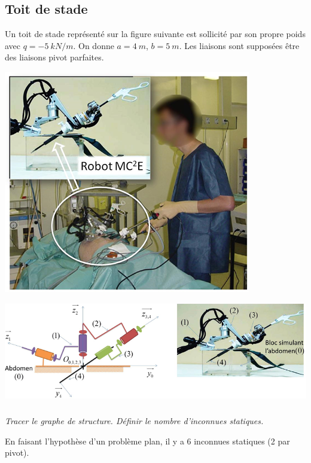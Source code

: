 \documentclass[10pt,fleqn]{article} %
\begin{document}

\vspace{4cm}
\pagestyle{fancy}
\thispagestyle{plain}


\def\columnseprulecolor{\color{ocre}}
\setlength{\columnseprule}{0.4pt} 

\ifprof
\else
\begin{multicols}{2}
\fi
\section*{Toit de stade}
Un toit de stade représenté sur la figure suivante est sollicité par son propre poids  avec $q=\SI{-5}{kN/m}$.  On donne $a=\SI{4}{m}$, $b=\SI{5}{m}$. Les liaisons sont supposées être des liaisons pivot parfaites.
\begin{center}
\includegraphics[width=.9\linewidth]{images/fig_01}
\end{center}

\begin{center}
\includegraphics[width=.9\linewidth]{images/fig_02}
\end{center}

\subparagraph{}\textit{Tracer le graphe de structure. Définir le nombre d'inconnues statiques.}
\ifprof
\begin{corrige}
En faisant l'hypothèse d'un problème plan, il y a 6 inconnues statiques (2 par pivot). 
\end{corrige}
\else
\fi


\end{multicols}
\end{document}

